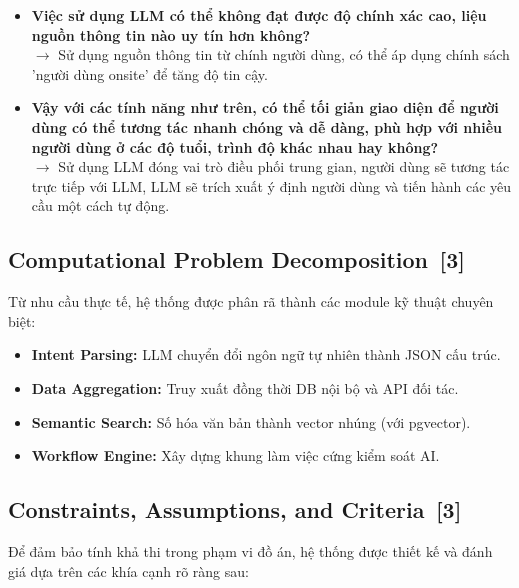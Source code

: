 \documentclass[12pt, a4paper]{article}
\begin{document}
\begin{itemize}[label=\textcolor{blue!70!black}{\faQuestionCircle}, leftmargin=0.5cm]
  \item \textbf{Việc sử dụng LLM có thể không đạt được độ chính xác cao, liệu nguồn thông tin nào uy tín hơn không?} \\
  $\rightarrow$ Sử dụng nguồn thông tin từ chính người dùng, có thể áp dụng chính sách 'người dùng onsite' để tăng độ tin cậy.

  \item \textbf{Vậy với các tính năng như trên, có thể tối giản giao diện để người dùng có thể tương tác nhanh chóng và dễ dàng, phù hợp với nhiều người dùng ở các độ tuổi, trình độ khác nhau hay không?} \\
  $\rightarrow$ Sử dụng LLM đóng vai trò điều phối trung gian, người dùng sẽ tương tác trực tiếp với LLM, LLM sẽ trích xuất ý định người dùng và tiến hành các yêu cầu một cách tự động.
\end{itemize}

\subsection[Computational Problem Decomposition]{Computational Problem Decomposition \,{\normalfont\small\textcolor{cyan!70!black}{[3]}}}
Từ nhu cầu thực tế, hệ thống được phân rã thành các module kỹ thuật chuyên biệt:
\begin{itemize}[label=\textcolor{blue!60}{\faCogs}]
  \item \textbf{Intent Parsing:} LLM chuyển đổi ngôn ngữ tự nhiên thành JSON cấu trúc.
  \item \textbf{Data Aggregation:} Truy xuất đồng thời DB nội bộ và API đối tác.
  \item \textbf{Semantic Search:} Số hóa văn bản thành vector nhúng (với pgvector).
  \item \textbf{Workflow Engine:} Xây dựng khung làm việc cứng kiểm soát AI.
\end{itemize}

\subsection[Constraints, Assumptions, and Criteria]{Constraints, Assumptions, and Criteria \,{\normalfont\small\textcolor{cyan!70!black}{[3]}}}
Để đảm bảo tính khả thi trong phạm vi đồ án, hệ thống được thiết kế và đánh giá dựa trên các khía cạnh rõ ràng sau:
\end{document}

